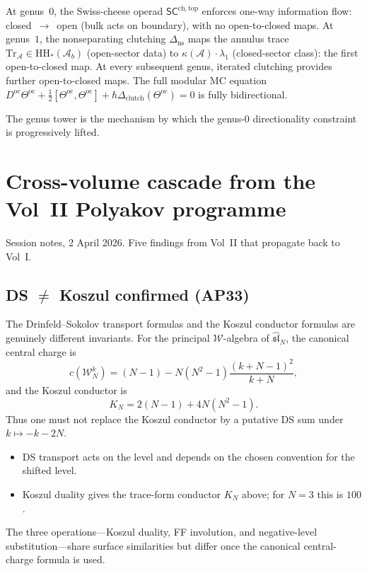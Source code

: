 \documentclass[11pt]{article}
\newcommand{\cA}{\mathcal{A}}
\newcommand{\cW}{\mathcal{W}}
\newcommand{\fsl}{\mathfrak{sl}}
\newcommand{\SCchtop}{\mathsf{SC}^{\mathrm{ch,top}}}
\begin{document}
\begin{observation}
\label{obs:directionality}
At genus~$0$, the Swiss-cheese operad $\SCchtop$ enforces
one-way information flow: closed~$\to$~open (bulk acts on
boundary), with no open-to-closed maps.  At genus~$1$,
the nonseparating clutching $\Delta_{\mathrm{ns}}$ maps the
annulus trace $\mathrm{Tr}_\cA \in \mathrm{HH}_*(\cA_b)$
(open-sector data) to $\kappa(\cA) \cdot \lambda_1$
(closed-sector class): the first open-to-closed map.  At
every subsequent genus, iterated clutching provides further
open-to-closed maps.  The full modular MC equation
$D^{\mathrm{oc}}\Theta^{\mathrm{oc}} +
\tfrac{1}{2}[\Theta^{\mathrm{oc}}, \Theta^{\mathrm{oc}}]
+ \hbar\Delta_{\mathrm{clutch}}(\Theta^{\mathrm{oc}}) = 0$
is fully bidirectional.

The genus tower is the mechanism by which the genus-$0$
directionality constraint is progressively lifted.
\end{observation}


\section{Cross-volume cascade from the Vol~II Polyakov programme}
\label{sec:cross-volume-2apr2026}

Session notes, 2 April 2026.  Five findings from Vol~II that
propagate back to Vol~I.

\subsection{DS $\neq$ Koszul confirmed (AP33)}
\label{subsec:ds-neq-koszul}

The Drinfeld--Sokolov transport formulas and the Koszul conductor
formulas are genuinely different invariants.  For the principal
$\cW$-algebra of $\widehat{\fsl}_N$, the canonical central charge is
\[
c(\cW_N^k)=(N-1)-N(N^2-1)\frac{(k+N-1)^2}{k+N},
\]
and the Koszul conductor is
\[
K_N=2(N-1)+4N(N^2-1).
\]
Thus one must not replace the Koszul conductor by a putative
DS sum under $k\mapsto-k-2N$.
\begin{itemize}[nosep]
\item DS transport acts on the level and depends on the chosen
  convention for the shifted level.
\item Koszul duality gives the trace-form conductor $K_N$ above;
  for $N=3$ this is $100$.
\end{itemize}
The three operations---Koszul duality, FF involution, and
negative-level substitution---share surface similarities but
differ once the canonical central-charge formula is used.
\end{document}
